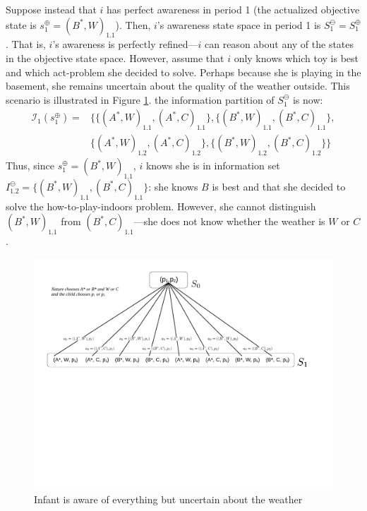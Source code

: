 \documentclass[
11pt,
titlepage,
reqno,
]{article}%
\theoremstyle{definition}
\begin{document}
Suppose instead that $i$ has perfect awareness in period 1 (the actualized objective state is $s^\oplus_1=(B^\ast,W)_{1.1}$). 
Then, $i$'s awareness state space in period 1 is $S^\ominus_1=S^\oplus_1$.
That is, $i$'s awareness is perfectly refined---$i$ can reason about any of the states in the objective state space.
However, assume that $i$ only knows which toy is best and which act-problem she decided to solve.
Perhaps because she is playing in the basement, she remains uncertain about the quality of the weather outside. 
This scenario is illustrated in Figure \ref{Diag: p-04}.
the information partition of $S^\ominus_1$ is now:
\begin{align*}
	\mathcal{I}_1(s^\oplus_1)=&\biggl\{\bigl\{(A^\ast,W)_{1.1},(A^\ast,C)_{1.1}\bigr\},\bigl\{(B^\ast,W)_{1.1},(B^\ast,C)_{1.1}\bigr\},\\
	&\bigl\{(A^\ast,W)_{1.2},(A^\ast,C)_{1.2}\bigr\},\bigl\{(B^\ast,W)_{1.2},(B^\ast,C)_{1.2}\bigr\}\biggr\}
\end{align*}
Thus, since $s^\oplus_1=(B^\ast,W)_{1.1}$, $i$ knows she is in information set $I^\ominus_{1.2}=\{(B^\ast,W)_{1.1},(B^\ast,C)_{1.1}\}$: she knows $B$ is best and that she decided to solve the how-to-play-indoors problem. 
However, she cannot distinguish $(B^\ast,W)_{1.1}$ from $(B^\ast,C)_{1.1}$---she does not know whether the weather is $W$ or $C$.

\begin{figure}[h!]
	\centering
	\includegraphics*[page=4,trim = 0in 6.5in 1in 0in,scale=.6]{Awareness_Diagrams_All}
	\caption{Infant is aware of everything but uncertain about the weather\label{Diag: p-04}}%
\end{figure}
\end{document}

